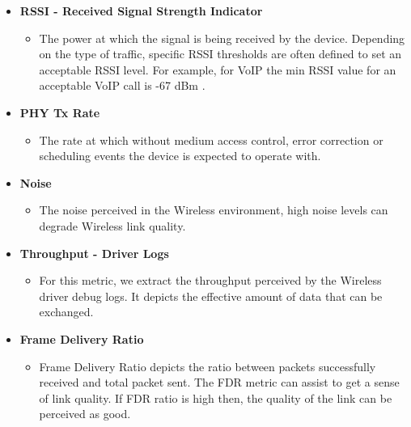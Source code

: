 \begin{itemize}
	\item \textbf{RSSI - Received Signal Strength Indicator}
	\begin{itemize}
		\item The power at which the signal is being received by the device. Depending on the type of traffic, specific RSSI thresholds are often defined to set an acceptable RSSI level. For example, for VoIP the min RSSI value for an acceptable VoIP call is -67 dBm \cite{Cisco_VoWLAN_Guide}.
	\end{itemize}
	
	\item \textbf{PHY Tx Rate}
	\begin{itemize}
		\item 	The rate at which without medium access control, error correction or scheduling events the device is expected to operate with.
	\end{itemize}
	
	\item \textbf{Noise}
	\begin{itemize}
		\item  The noise perceived in the Wireless environment, high noise levels can degrade Wireless link quality.
	\end{itemize}
	
	\item \textbf{Throughput - Driver Logs}
	\begin{itemize}
		\item 	For this metric, we extract the throughput perceived by the Wireless driver debug logs. It depicts the effective amount of data that can be exchanged.
	\end{itemize}
	
	\item \textbf{Frame Delivery Ratio}
	\begin{itemize}
		\item Frame Delivery Ratio depicts the ratio between packets successfully received and total packet sent. The FDR metric can assist to get a sense of link quality. If FDR ratio is high then, the quality of the link can be perceived as good.
	\end{itemize}

\end{itemize}

